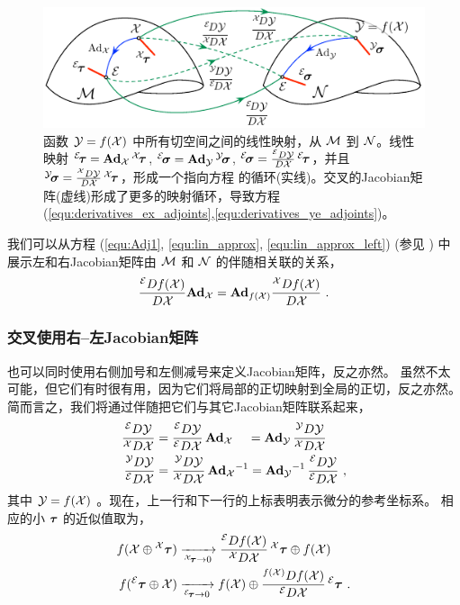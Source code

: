 \begin{figure}[tb]
\centering
\includegraphics{figures/jacobians_adjoints}
\caption{函数 $\cY=f(\cX)$ 中所有切空间之间的线性映射，从 $\cM$ 到 $\cN$。线性映射 ${{^\cE}\!\bftau=\Ad[\cM]{\cX}\,{^\cX}\!\bftau}$, ${{^\cE}\!\bfsigma=\Ad[\cN]{\cY}\,{^\cY}\!\bfsigma}$, ${{^\cE}\!\bfsigma=\ldpar{\cY}{\cX}\,{^\cE}\!\bftau}$，并且 ${{^\cY}\!\bfsigma=\rdpar{\cY}{\cX}\,{^\cX}\!\bftau}$，形成一个指向方程  的循环(实线)。交叉的Jacobian矩阵(虚线)形成了更多的映射循环，导致方程 (\ref{equ:derivatives_ex_adjoints},\ref{equ:derivatives_ye_adjoints})。} 
\label{fig:jacobians_adjoints}
\end{figure}

我们可以从方程 (\ref{equ:Adj1}, \ref{equ:lin_approx}, \ref{equ:lin_approx_left}) (参见 ) 中展示左和右Jacobian矩阵由 $\cM$ 和 $\cN$ 的伴随相关联的关系，
%
\begin{align}\label{equ:derivatives_lr_adjoints}
\ldpar{f(\cX)}{\cX}\Ad[\cM]{\cX} = \Ad[\cN]{f(\cX)}\rdpar{f(\cX)}{\cX} 
~.
\end{align}


\subsubsection{交叉使用右--左Jacobian矩阵}

也可以同时使用右侧加号和左侧减号来定义Jacobian矩阵，反之亦然。
虽然不太可能，但它们有时很有用，因为它们将局部的正切映射到全局的正切，反之亦然。
简而言之，我们将通过伴随把它们与其它Jacobian矩阵联系起来，
%
\begin{align}
\lrdpar{\cY}{\cX} &= \lldpar{\cY}{\cX}\,\Ad{\cX} ~~~\,= \Ad{\cY}\,\rrdpar{\cY}{\cX} \label{equ:derivatives_ex_adjoints}\\
\rldpar{\cY}{\cX} &= \rrdpar{\cY}{\cX}\,\Ad{\cX}\inv = \Ad{\cY}\inv\,\lldpar{\cY}{\cX}\label{equ:derivatives_ye_adjoints}
~,
\end{align}
%
其中 $\cY=f(\cX)$ 。现在，上一行和下一行的上标表明表示微分的参考坐标系。
相应的小 $\bftau$ 的近似值取为，
%
\begin{align}
f(\cX\op{^\cX}\bftau) 
 &\xrightarrow[{^\cX\!\bftau}\to0]{} \lrdpar{f(\cX)}{\cX}\,{^\cX}\bftau \op f(\cX) \label{equ:lin_approx_rl}\\
f({^\cE}\bftau\op\cX) 
 &\xrightarrow[{^\cE\!\bftau}\to0]{} f(\cX) \op \rldpar{f(\cX)}{\cX}\,{^\cE}\bftau \label{equ:lin_approx_lr}
 ~.
\end{align}



